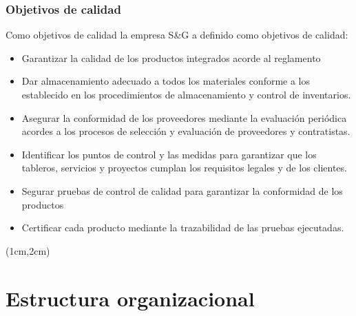\subsubsection{Objetivos de calidad} 
Como objetivos de calidad la empresa S\&G a definido como objetivos de calidad:
\begin{itemize}
    \item Garantizar la calidad de los productos integrados acorde al reglamento
    \item Dar almacenamiento adecuado a todos los materiales conforme a los establecido en los procedimientos de almacenamiento y control de inventarios.
    \item Asegurar la conformidad de los proveedores mediante la evaluación periódica acordes a los procesos de selección y evaluación de proveedores y contratistas.
    \item Identificar los puntos de control y las medidas para garantizar que los tableros, servicios y proyectos cumplan los requisitos legales y de los clientes.
    \item Segurar pruebas de control de calidad para garantizar la conformidad de los productos
    \item Certificar cada producto mediante la trazabilidad de las pruebas ejecutadas.
\end{itemize}


\begin{landscape}
\thispagestyle{empty}

\begin{textblock*}{\textheight}(1cm,2cm) %
\end{textblock*}
\vspace*{0.5px}

\section{Estructura organizacional}


\end{landscape}

